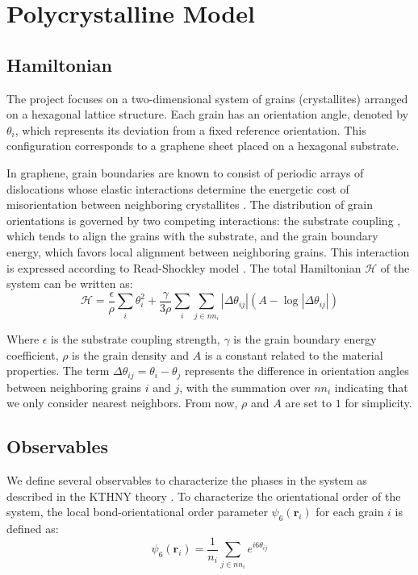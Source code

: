 \section{Polycrystalline Model}

\subsection{Hamiltonian}

The project focuses on a two-dimensional system of grains (crystallites) arranged on a hexagonal lattice structure. Each grain has an orientation angle, denoted by $\theta_i$, which represents its deviation from a fixed reference orientation. This configuration corresponds to a graphene sheet placed on a hexagonal substrate.

In graphene, grain boundaries are known to consist of periodic arrays of dislocations whose elastic interactions determine the energetic cost of misorientation between neighboring crystallites \cite{Yazyev2010}. The distribution of grain orientations is governed by two competing interactions: the substrate coupling \cite{Rogge2015}, which tends to align the grains with the substrate, and the grain boundary energy, which favors local alignment between neighboring grains. This interaction is expressed according to Read-Shockley model \cite{Read1950}. The total Hamiltonian $\mathcal{H}$ of the system can be written as:
\begin{equation}
    \mathcal{H} = \frac{\epsilon}{\rho} \sum_i \theta_i^2 + \frac{\gamma}{3\rho} \sum_i \sum_{j \in nn_i} \left|\Delta \theta_{ij}\right| \left(A - \log\left|\Delta \theta_{ij}\right|\right)
    \label{eq:hamiltonian}
\end{equation}

Where $\epsilon$ is the substrate coupling strength, $\gamma$ is the grain boundary energy coefficient, $\rho$ is the grain density and $A$ is a constant related to the material properties. The term $\Delta \theta_{ij} = \theta_i - \theta_j$ represents the difference in orientation angles between neighboring grains $i$ and $j$, with the summation over $nn_i$ indicating that we only consider nearest neighbors. From now, $\rho$ and $A$ are set to $1$ for simplicity.

\subsection{Observables}

We define several observables to characterize the phases in the system as described in the KTHNY theory \cite{ Nelson1978,Nelson1979,Kosterlitz1973,Young1979}. To characterize the orientational order of the system, the local bond-orientational order parameter $\psi_6(\mathbf{r}_i)$ for each grain $i$ is defined as:
\begin{equation}
    \psi_6(\mathbf{r}_i) = \frac{1}{n_i} \sum_{j \in nn_i} e^{i 6 \theta_{ij}}
\end{equation}

